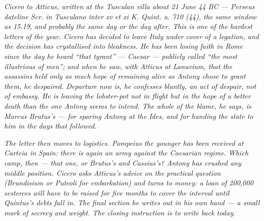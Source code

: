 
\textit{Cicero to Atticus, written at the Tusculan villa about
21 June 44 BC --- Perseus dateline \textit{Scr. in Tusculano
inter xv et xi K. Quint. a. 710 (44)}, the same window as 15.19,
and probably the same day or the day after. This is one of the
hardest letters of the year. Cicero has decided to leave Italy
under cover of a legation, and the decision has crystallised
into bleakness. He has been losing faith in Rome since the day
he heard ``that tyrant'' --- Caesar --- publicly called ``the
most illustrious of men''; and when he saw, with Atticus at
Lanuvium, that the assassins held only as much hope of
remaining alive as Antony chose to grant them, he despaired.
Departure now is, he confesses bluntly, an act of despair, not
of embassy. He is leaving the lobster-pot not in flight but in
the hope of a better death than the one Antony seems to
intend. The whole of the blame, he says, is Marcus Brutus's
--- for sparing Antony at the Ides, and for handing the state
to him in the days that followed.}

\textit{The letter then moves to logistics. Pompeius the
younger has been received at Carteia in Spain: there is again
an army against the Caesarian regime. Which camp, then ---
that one, or Brutus's and Cassius's? Antony has crushed any
middle position. Cicero asks Atticus's advice on the practical
question (Brundisium or Puteoli for embarkation) and turns to
money: a loan of 200,000 sesterces will have to be raised for
five months to cover the interval until Quintus's debts fall
in. The final section he writes out in his own hand --- a
small mark of secrecy and weight. The closing instruction is
to write back today.}
